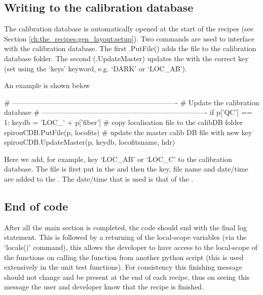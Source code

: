 \clearpage
\newpage
\subsection{Writing to the calibration database}
\label{ch:the_recipes:gen_layout:writing_calibdb}

The calibration database is automatically opened at the start of the recipes (see Section \ref{ch:the_recipes:gen_layout:setup}). Two commands are used to interface with the calibration database. The first \spirouCDB.PutFile() adds the file to the calibration database folder. The second (\spirouCDB.UpdateMaster) updates the \masterCALIBDBfile with the correct key (set using the `keys' keyword, e.g. `DARK' or `LOC\_AB').


\vspace{0.5cm}
\begin{minipage}{\textwidth}
\noindent An example is shown below
\begin{pythonbox}
# ----------------------------------------------------------------------
# Update the calibration database
# ----------------------------------------------------------------------
if p['QC'] == 1:
    keydb = 'LOC_' + p['fiber']
    # copy localisation file to the calibDB folder
    spirouCDB.PutFile(p, locofits)
    # update the master calib DB file with new key
    spirouCDB.UpdateMaster(p, keydb, locofitsname, hdr)
\end{pythonbox}
\begin{note}
Here we add, for example, key `LOC\_AB' or `LOC\_C' to the calibration database. The file is first put in the  and then the key, file name and date/time are added to the \masterCALIBDBfile. The date/time that is used is that of the .
\end{note}
\end{minipage}

\subsection{End of code}
\label{ch:the_recipes:gen_layout:end}

After all the main section is completed, the code should end with the final log statement. This is followed by a returning of the local-scope variables (via the `locals()' command), this allows the developer to have access to the local-scope of the functions on calling the function from another python script (this is used extensively in the unit test functions). For consistency this finishing message should not change and be present at the end of each recipe, thus on seeing this message the user and developer know that the recipe is finished.

